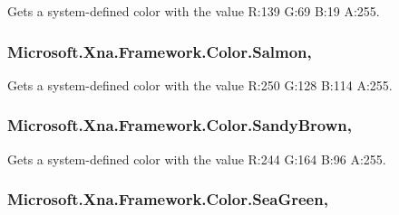 Gets a system-\/defined color with the value R\+:139 G\+:69 B\+:19 A\+:255.

\hypertarget{struct_microsoft_1_1_xna_1_1_framework_1_1_color_a9fc8566f5de44fea4a4d98b8ac7729d6}{}
\subsubsection[{Salmon}]{ Microsoft.\+Xna.\+Framework.\+Color.\+Salmon\hspace{0.3cm}{\ttfamily [static]}, {\ttfamily [get]}}\label{struct_microsoft_1_1_xna_1_1_framework_1_1_color_a9fc8566f5de44fea4a4d98b8ac7729d6}


Gets a system-\/defined color with the value R\+:250 G\+:128 B\+:114 A\+:255.

\hypertarget{struct_microsoft_1_1_xna_1_1_framework_1_1_color_ac01e6d4915ef4d4fc9cff415497b7734}{}
\subsubsection[{Sandy\+Brown}]{ Microsoft.\+Xna.\+Framework.\+Color.\+Sandy\+Brown\hspace{0.3cm}{\ttfamily [static]}, {\ttfamily [get]}}\label{struct_microsoft_1_1_xna_1_1_framework_1_1_color_ac01e6d4915ef4d4fc9cff415497b7734}


Gets a system-\/defined color with the value R\+:244 G\+:164 B\+:96 A\+:255.

\hypertarget{struct_microsoft_1_1_xna_1_1_framework_1_1_color_adeac6164af113d3dec9757cab91180eb}{}
\subsubsection[{Sea\+Green}]{ Microsoft.\+Xna.\+Framework.\+Color.\+Sea\+Green\hspace{0.3cm}{\ttfamily [static]}, {\ttfamily [get]}}\label{struct_microsoft_1_1_xna_1_1_framework_1_1_color_adeac6164af113d3dec9757cab91180eb}


